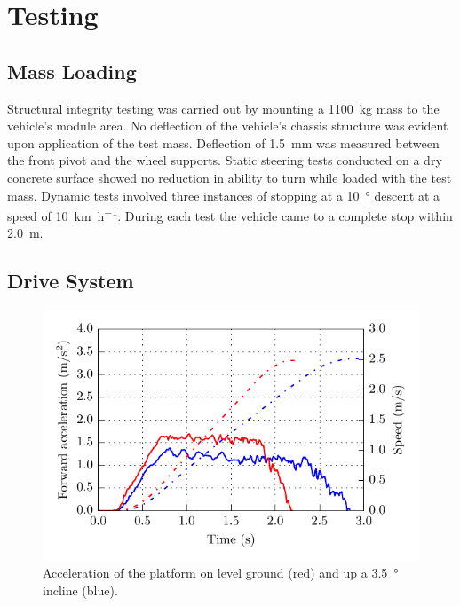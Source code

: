 \documentclass[preprint,authoryear,12pt]{elsarticle}
\begin{document}
\section{Testing}
\label{sub:testing}

  \subsection{Mass Loading}
    Structural integrity testing was carried out by mounting a \SI{1100}{\kilo\gram} mass to the vehicle's module area.
    No deflection of the vehicle's chassis structure was evident upon application of the test mass.
    Deflection of \SI{1.5}{\milli\meter} was measured between the front pivot and the wheel supports.
    Static steering tests conducted on a dry concrete surface showed no reduction in ability to turn while loaded with the test mass.
    Dynamic tests involved three instances of stopping at a \SI{10}{\degree} descent at a speed of \SI{10}{\kilo\meter\per\hour}.
    During each test the vehicle came to a complete stop within \SI{2.0}{\meter}.

  \subsection{Drive System}

    \begin{figure}[htb]
        \centering
        \includegraphics{imgs/drive_system/graph_acceleration.pdf}
        \caption{
            Acceleration of the platform on level ground (red) and up a \SI{3.5}{\degree} incline (blue).
        }
        \label{fig:acceleration}
    \end{figure}
\end{document}
